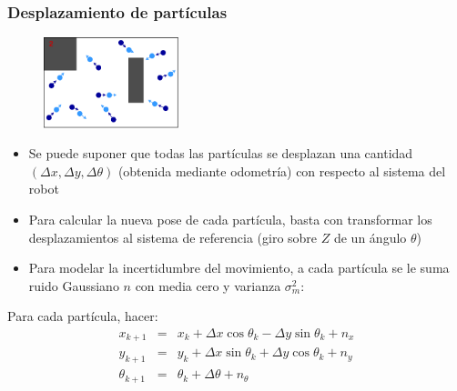 \begin{frame}\frametitle{Desplazamiento de partículas}
  \begin{figure}
    \centering
    \includegraphics[width=0.35\textwidth]{Figures/MotionPlanning/ParticleFilter2.pdf}
  \end{figure}
  \begin{itemize}
  \item Se puede suponer que todas las partículas se desplazan una cantidad $(\Delta x, \Delta y, \Delta\theta)$ (obtenida mediante odometría) con respecto al sistema del robot
  \item Para calcular la nueva pose de cada partícula, basta con transformar los desplazamientos al sistema de referencia (giro sobre $Z$ de un ángulo $\theta$)
  \item Para modelar la incertidumbre del movimiento, a cada partícula se le suma ruido Gaussiano $n$ con media cero y varianza $\sigma_m^2$:
  \end{itemize}
  Para cada partícula, hacer:
  \begin{eqnarray*}
    x_{k+1} &=& x_k + \Delta x\cos\theta_k - \Delta y\sin\theta_k + n_x\\
    y_{k+1} &=& y_k + \Delta x\sin\theta_k + \Delta y\cos\theta_k + n_y\\
    \theta_{k+1} &=& \theta_k  + \Delta\theta + n_{\theta}
  \end{eqnarray*}
\end{frame}

